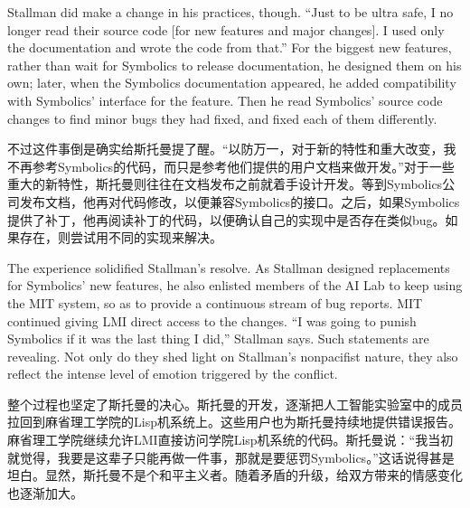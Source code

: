 \ifdefined\eng
Stallman did make a change in his practices, though.  ``Just to be ultra safe, I no longer read their source code [for new features and major changes]. I used only the documentation and wrote the code from that.''  For the biggest new features, rather than wait for Symbolics to release documentation, he designed them on his own; later, when the Symbolics documentation appeared, he added compatibility with Symbolics' interface for the feature.  Then he read Symbolics' source code changes to find minor bugs they had fixed, and fixed each of them differently.
\fi

\ifdefined\chs
不过这件事倒是确实给斯托曼提了醒。``以防万一，对于新的特性和重大改变，我不再参考Symbolics的代码，而只是参考他们提供的用户文档来做开发。''对于一些重大的新特性，斯托曼则往往在文档发布之前就着手设计开发。等到Symbolics公司发布文档，他再对代码修改，以便兼容Symbolics的接口。之后，如果Symbolics提供了补丁，他再阅读补丁的代码，以便确认自己的实现中是否存在类似bug。如果存在，则尝试用不同的实现来解决。
\fi

\ifdefined\eng
The experience solidified Stallman's resolve. As Stallman designed replacements for Symbolics' new features, he also enlisted members of the AI Lab to keep using the MIT system, so as to provide a continuous stream of bug reports. MIT continued giving LMI direct access to the changes. ``I was going to punish Symbolics if it was the last thing I did,'' Stallman says.  Such statements are revealing. Not only do they shed light on Stallman's nonpacifist nature, they also reflect the intense level of emotion triggered by the conflict.
\fi

\ifdefined\chs
整个过程也坚定了斯托曼的决心。斯托曼的开发，逐渐把人工智能实验室中的成员拉回到麻省理工学院的Lisp机系统上。这些用户也为斯托曼持续地提供错误报告。麻省理工学院继续允许LMI直接访问学院Lisp机系统的代码。斯托曼说：``我当初就觉得，我要是这辈子只能再做一件事，那就是要惩罚Symbolics。''这话说得甚是坦白。显然，斯托曼不是个和平主义者。随着矛盾的升级，给双方带来的情感变化也逐渐加大。
\fi

